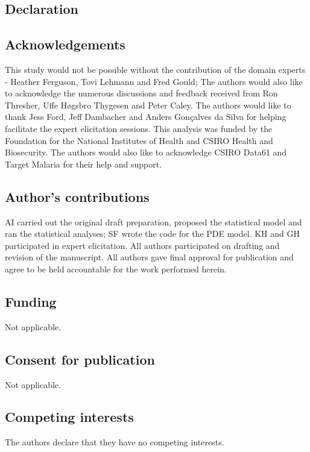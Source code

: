 \documentclass[]{bmcart}
\begin{document}
\begin{backmatter}

\section*{Declaration}

\subsection*{Acknowledgements}
 This study would not be possible without the contribution of the domain experts - Heather Ferguson, Tovi Lehmann and Fred Gould; The authors would also like to acknowledge the numerous discussions and feedback received from Ron Thresher, Uffe Høgsbro Thygesen and Peter Caley. The authors would like to thank Jess Ford, Jeff Dambacher and Anders Gonçalves da Silva for helping facilitate the expert elicitation sessions. This analysis was funded by the Foundation for the National Institutes of Health and CSIRO Health and Biosecurity. The authors would also like to acknowledge CSIRO Data61 and Target Malaria for their help and support.


\subsection*{Author's contributions}
AI carried out the original draft preparation, proposed the statistical model and ran the statistical analyses; SF wrote the code for the PDE model. KH and GH participated in expert elicitation. All authors participated on drafting and revision of the manuscript. All authors gave final approval for publication and 
agree to be held accountable for the work performed herein.

\subsection*{Funding}
Not applicable.

\subsection*{Consent for publication}
Not applicable.

\subsection*{Competing interests}
The authors declare that they have no competing interests.


\end{backmatter}
\end{document}

